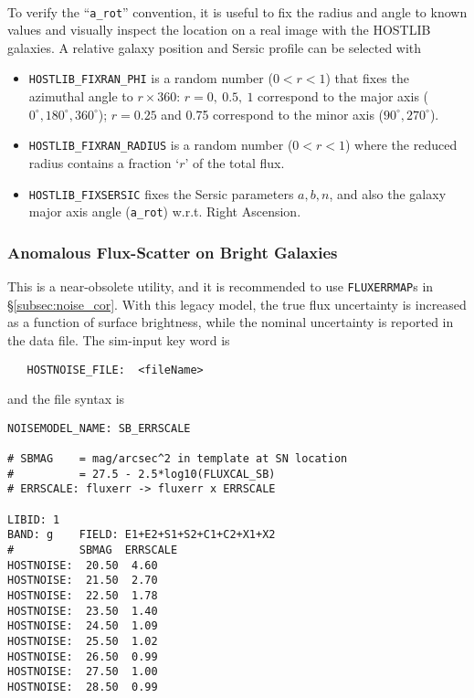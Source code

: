 \documentclass[12pt]{article}
\begin{document}
{\bigskip
{} \\
To verify the ``{\tt a\_rot}'' convention, it is useful to fix the
radius and angle to known values and visually inspect the location
on a real image with the HOSTLIB galaxies. A relative
galaxy position and Sersic profile can be selected with
\begin{itemize}
  \item {\tt HOSTLIB\_FIXRAN\_PHI} is a random number ($0<r<1$) 
        that fixes the azimuthal angle to $r\times 360$:
        $r=0,~0.5,~1$ correspond to the major axis 
        ($0^{\circ},180^{\circ},360^{\circ}$); 
        $r=0.25$ and 0.75 correspond to the minor axis
        ($90^{\circ},270^{\circ}$).
  \item {\tt HOSTLIB\_FIXRAN\_RADIUS} is a random number ($0<r<1$)
         where the reduced radius contains a fraction  
         `$r$' of the total flux.
%
 \item {\tt HOSTLIB\_FIXSERSIC} fixes the Sersic parameters
       $a,b,n$, and also the galaxy major axis angle ({\tt a\_rot})
       w.r.t. Right Ascension.
\end{itemize}


\clearpage
\subsubsection{Anomalous Flux-Scatter on Bright Galaxies}

This is a near-obsolete utility, and it is recommended to use
{\tt FLUXERRMAP}s in \S\ref{subsec:noise_cor}.
With this legacy model, the true flux uncertainty is increased as a 
function of surface brightness, while the nominal uncertainty is 
reported in the data file.
The sim-input key word is
%
\begin{verbatim}
   HOSTNOISE_FILE:  <fileName>
\end{verbatim}
%
and the file syntax is
%
\begin{Verbatim}[frame=single]
NOISEMODEL_NAME: SB_ERRSCALE 

# SBMAG    = mag/arcsec^2 in template at SN location 
#          = 27.5 - 2.5*log10(FLUXCAL_SB) 
# ERRSCALE: fluxerr -> fluxerr x ERRSCALE 

LIBID: 1 
BAND: g    FIELD: E1+E2+S1+S2+C1+C2+X1+X2 
#          SBMAG  ERRSCALE  
HOSTNOISE:  20.50  4.60 
HOSTNOISE:  21.50  2.70 
HOSTNOISE:  22.50  1.78 
HOSTNOISE:  23.50  1.40 
HOSTNOISE:  24.50  1.09 
HOSTNOISE:  25.50  1.02 
HOSTNOISE:  26.50  0.99 
HOSTNOISE:  27.50  1.00 
HOSTNOISE:  28.50  0.99 


\end{Verbatim}}
\end{document}
